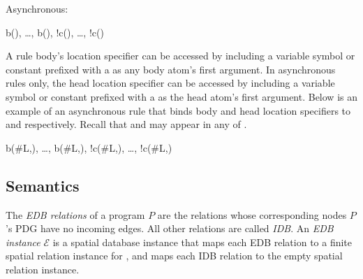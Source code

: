 Asynchronous:

\begin{Drules}
        {b(), \ldots, b(), !c(), \ldots, !c()}
\end{Drules}

A rule body's location specifier can be accessed by including a variable symbol or constant prefixed with a \dedalus{#} as any body atom's first argument.  In asynchronous rules only, the head location specifier can be accessed by including a variable symbol or constant prefixed with a \dedalus{#} as the head atom's first argument.  Below is an example of an asynchronous rule that binds body and head location specifiers to  and  respectively.  Recall that  and  may appear in any of .

\begin{Drules}
        {b(#L,), \ldots, b(#L,), !c(#L,), \ldots, !c(#L,)}
\end{Drules}





\subsection{Semantics}
The {\em EDB relations} of a \lang program $P$ are the relations whose corresponding nodes $P$'s PDG have no incoming edges.  All other relations are called {\em IDB}.
An {\em EDB instance} $\mathcal{E}$ is a spatial database instance that maps each EDB relation  to a finite spatial relation instance for , and maps each IDB relation  to the empty spatial relation instance.

